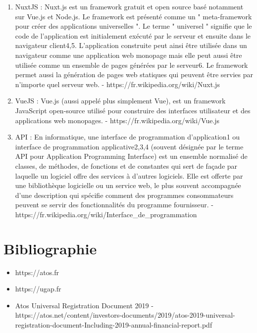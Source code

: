 \documentclass[12pt]{article}
\begin{document}
\begin {sloppypar}
\begin{enumerate}
    - https://fr.wikipedia.org/wiki/Nom\_de\_domaine
  \item 
    NuxtJS : Nuxt.js est un framework gratuit et open source basé notamment sur Vue.js et Node.js. Le framework est présenté comme un " meta-framework pour créer des applications universelles ". Le terme " universel " signifie que le code de l'application est initialement exécuté par le serveur et ensuite dans le navigateur client4,5. L'application construite peut ainsi être utilisée dans un navigateur comme une application web monopage mais elle peut aussi être utilisée comme un ensemble de pages générées par le serveur6. Le framework permet aussi la génération de pages web statiques qui peuvent être servies par n'importe quel serveur web. 
    - https://fr.wikipedia.org/wiki/Nuxt.js
  \item 
    VueJS : Vue.js (aussi appelé plus simplement Vue), est un framework JavaScript open-source utilisé pour construire des interfaces utilisateur et des applications web monopages.
    - https://fr.wikipedia.org/wiki/Vue.js
  \item 
    API : En informatique, une interface de programmation d’application1 ou interface de programmation applicative2,3,4 (souvent désignée par le terme API pour Application Programming Interface) est un ensemble normalisé de classes, de méthodes, de fonctions et de constantes qui sert de façade par laquelle un logiciel offre des services à d'autres logiciels. Elle est offerte par une bibliothèque logicielle ou un service web, le plus souvent accompagnée d'une description qui spécifie comment des programmes consommateurs peuvent se servir des fonctionnalités du programme fournisseur. 
    - https://fr.wikipedia.org/wiki/Interface\_de\_programmation 
  

\end{enumerate}
\newpage
\section{Bibliographie}
\begin{itemize}
  \item 
    https://atos.fr
  \item 
    https://ugap.fr 
  \item 
    Atos Universal Registration Document 2019 - https://atos.net/content/investors-documents/2019/atos-2019-universal-registration-document-Including-2019-annual-financial-report.pdf
\end{itemize}
\end{sloppypar}
\end{document}
